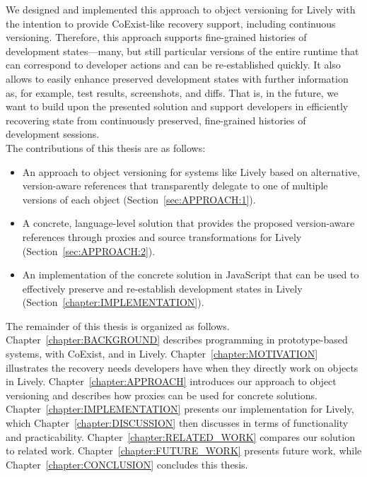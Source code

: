 We designed and implemented this approach to object versioning for Lively with the intention to provide CoExist-like recovery support, including continuous versioning.
Therefore, this approach supports fine-grained histories of development states---many, but still particular versions of the entire runtime that can correspond to developer actions and can be re-established quickly.
It also allows to easily enhance preserved development states with further information as, for example, test results, screenshots, and diffs.
That is, in the future, we want to build upon the presented solution and support developers in efficiently recovering state from continuously preserved, fine-grained histories of development sessions.\\

The contributions of this thesis are as follows:
\begin{itemize}
    \item An approach to object versioning for systems like Lively based on alternative, version-aware references that transparently delegate to one of multiple versions of each object (Section~\ref{sec:APPROACH:1}).
    \item A concrete, language-level solution that provides the proposed version-aware references through proxies and source transformations for Lively (Section~\ref{sec:APPROACH:2}).
    \item An implementation of the concrete solution in JavaScript that can be used to effectively preserve and re-establish development states in Lively (Section~\ref{chapter:IMPLEMENTATION}).\\
\end{itemize}

The remainder of this thesis is organized as follows. 
Chapter~\ref{chapter:BACKGROUND} describes programming in prototype-based systems, with CoExist, and in Lively.
Chapter~\ref{chapter:MOTIVATION} illustrates the recovery needs developers have when they directly work on objects in Lively.
Chapter~\ref{chapter:APPROACH} introduces our approach to object versioning and describes how proxies can be used for concrete solutions.
Chapter~\ref{chapter:IMPLEMENTATION} presents our implementation for Lively, which Chapter~\ref{chapter:DISCUSSION} then discusses in terms of functionality and practicability.
Chapter~\ref{chapter:RELATED_WORK} compares our solution to related work.
Chapter~\ref{chapter:FUTURE_WORK} presents future work, while Chapter~\ref{chapter:CONCLUSION} concludes this thesis.
